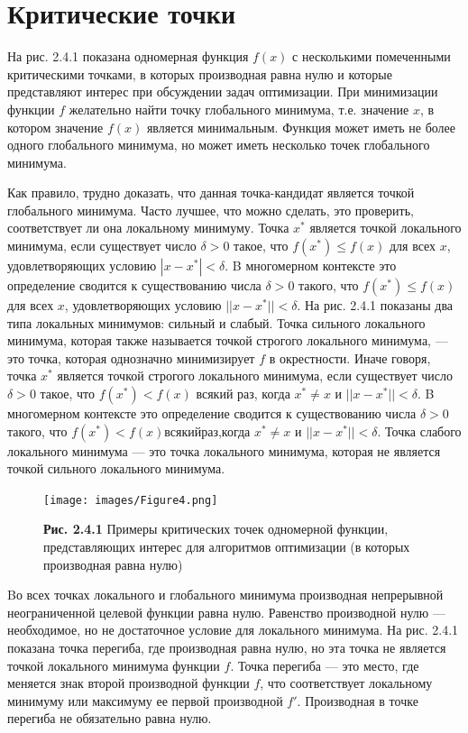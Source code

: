 \section{Критические точки}

На рис. 2.4.1 показана одномерная функция $f(x)$ с несколькими помеченными критическими точками, в которых производная равна нулю и которые представляют интерес при обсуждении задач оптимизации. При минимизации функции $f$ желательно найти точку глобального минимума, т.е. значение $x$, в котором значение $f(x)$ является минимальным. Функция может иметь не более одного глобального минимума, но может иметь несколько точек глобального минимума.

Как правило, трудно доказать, что данная точка-кандидат является точкой глобального минимума. Часто лучшее, что можно сделать, это проверить, соответствует ли она локальному минимуму. Точка $x^*$ является точкой локального минимума, если существует число $\delta > 0$ такое, что $f(x^*) \leq f(x)$ для всех $x$, удовлетворяющих условию $| x - x^*| < \delta$. B многомерном контексте это определение сводится к существованию числа $\delta > 0$ такого, что $f(x^*) \leq f (x)$ для всех $x$, удовлетворяющих условию $||x - x^*|| < \delta$.
На рис. 2.4.1 показаны два типа локальных минимумов: сильный и слабый. Точка сильного локального минимума, которая также называется точкой строгого локального минимума, — это точка, которая однозначно минимизирует $f$ в окрестности. Иначе говоря, точка $x^*$ является точкой строгого локального минимума, если существует число $\delta > 0$ такое, что $f(x^*) < f(x)$ всякий раз, когда $x^* \neq x$ и $||x - x^*|| < \delta$. B многомерном контексте это определение сводится к существованию числа $\delta > 0$ такого, что $f(x^*)< f(x)$всякийраз,когда $x^* \neq x$ и $||x - x^*||< \delta$. Точка слабого локального минимума — это точка локального минимума, которая не является точкой сильного локального минимума.

\begin{figure}[ht]
 \centering
		\texttt{[image: images/Figure4.png]}
		\caption{ \textbf{Рис. 2.4.1} Примеры критических точек одномерной функции, представляющих интерес для алгоритмов оптимизации (в которых производная равна нулю)
 }
	\end{figure}
    
Bо всех точках локального и глобального минимума производная непрерывной неограниченной целевой функции равна нулю. Равенство производной нулю — необходимое, но не достаточное условие для локального минимума.
На рис. 2.4.1 показана точка перегиба, где производная равна нулю, но эта точка не является точкой локального минимума функции $f$. Точка перегиба — это место, где меняется знак второй производной функции $f$, что соответствует локальному минимуму или максимуму ее первой производной $f '$. Производная в точке перегиба не обязательно равна нулю.
